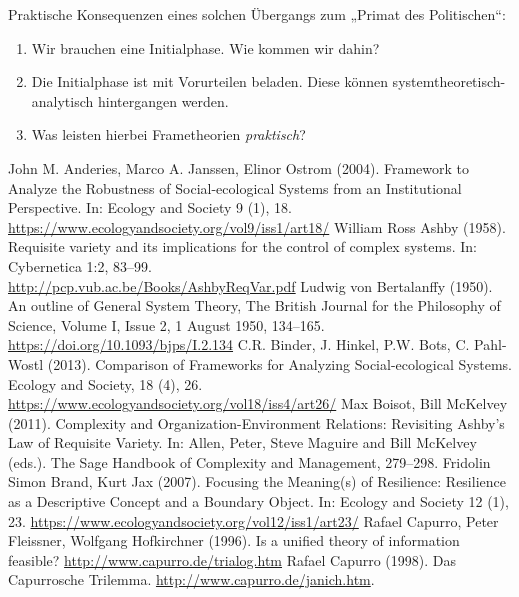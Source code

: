 \documentclass[11pt,a4paper]{article}
\begin{document}
Praktische Konsequenzen eines solchen Übergangs zum „Primat des Politischen“:
\begin{enumerate}[noitemsep]
\item Wir brauchen eine Initialphase. Wie kommen wir dahin?
\item Die Initialphase ist mit Vorurteilen beladen. Diese können
  systemtheoretisch-analytisch hintergangen werden.
\item Was leisten hierbei Frametheorien \emph{praktisch}?
\end{enumerate}

\begin{thebibliography}{xxx}
 John M. Anderies, Marco A. Janssen, Elinor Ostrom
  (2004).  Framework to Analyze the Robustness of Social-ecological Systems
  from an Institutional Perspective. In: Ecology and Society 9 (1),
  18.\\ \url{https://www.ecologyandsociety.org/vol9/iss1/art18/}
 William Ross Ashby (1958).  Requisite variety and its
  implications for the control of complex systems. In: Cybernetica 1:2,
  83--99.\\ \url{http://pcp.vub.ac.be/Books/AshbyReqVar.pdf}
 Ludwig von Bertalanffy (1950). An outline of General
  System Theory, The British Journal for the Philosophy of Science, Volume I,
  Issue 2, 1 August 1950, 134–165.\\
  \url{https://doi.org/10.1093/bjps/I.2.134}
 C.R. Binder, J. Hinkel, P.W. Bots, C. Pahl-Wostl (2013).
  Comparison of Frameworks for Analyzing Social-ecological Systems. Ecology
  and Society, 18 (4), 26.  \\
  \url{https://www.ecologyandsociety.org/vol18/iss4/art26/}
 Max Boisot, Bill McKelvey (2011). Complexity and
  Organization-Environment Relations: Revisiting Ashby’s Law of Requisite
  Variety. In: Allen, Peter, Steve Maguire and Bill McKelvey (eds.). The Sage
  Handbook of Complexity and Management, 279--298. 
 Fridolin Simon Brand, Kurt Jax (2007).  Focusing the
  Meaning(s) of Resilience: Resilience as a Descriptive Concept and a Boundary
  Object. In: Ecology and Society 12 (1), 23.
  \url{https://www.ecologyandsociety.org/vol12/iss1/art23/}
 Rafael Capurro, Peter Fleissner, Wolfgang Hofkirchner
  (1996). Is a unified theory of information feasible?
  \url{http://www.capurro.de/trialog.htm}
 Rafael Capurro (1998). Das Capurrosche Trilemma.
  \url{http://www.capurro.de/janich.htm}.

\end{thebibliography}
\end{document}
